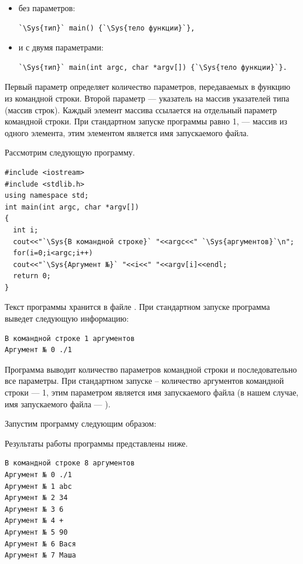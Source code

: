 \begin{itemize}
\item без параметров:
\begin{lstlisting}
`\Sys{тип}` main() {`\Sys{тело функции}`},
\end{lstlisting}
\item и с двумя параметрами:
\begin{lstlisting}
`\Sys{тип}` main(int argc, char *argv[]) {`\Sys{тело функции}`}.
\end{lstlisting}
\end{itemize}

Первый параметр  определяет количество параметров, передаваемых в функцию  из командной
строки. Второй параметр  --- указатель на массив указателей типа
 (массив строк). Каждый элемент массива ссылается на
отдельный параметр командной строки. При стандартном запуске программы  равно 1, 
 --- массив из одного элемента,
этим элементом является имя запускаемого файла.

Рассмотрим следующую программу. 
\begin{lstlisting}
#include <iostream>
#include <stdlib.h>
using namespace std;
int main(int argc, char *argv[])
{
  int i;
  cout<<"`\Sys{В командной строке}` "<<argc<<" `\Sys{аргументов}`\n";
  for(i=0;i<argc;i++)
  cout<<"`\Sys{Аргумент №}` "<<i<<" "<<argv[i]<<endl;
  return 0;
}
\end{lstlisting}

Текст программы хранится в файле . При стандартном запуске программа выведет следующую
информацию:
\begin{verbatim}
В командной строке 1 аргументов
Аргумент № 0 ./1
\end{verbatim}
Программа выводит количество параметров командной строки и последовательно все параметры. При стандартном запуске –
количество аргументов командной строки --- 1, этим параметром является имя запускаемого файла (в нашем случае, имя
запускаемого файла --- ).

Запустим программу следующим образом: 


Результаты работы программы представлены ниже.
\begin{verbatim}
В командной строке 8 аргументов 
Аргумент № 0 ./1 
Аргумент № 1 abc 
Аргумент № 2 34 
Аргумент № 3 6 
Аргумент № 4 + 
Аргумент № 5 90 
Аргумент № 6 Вася 
Аргумент № 7 Маша
\end{verbatim}

